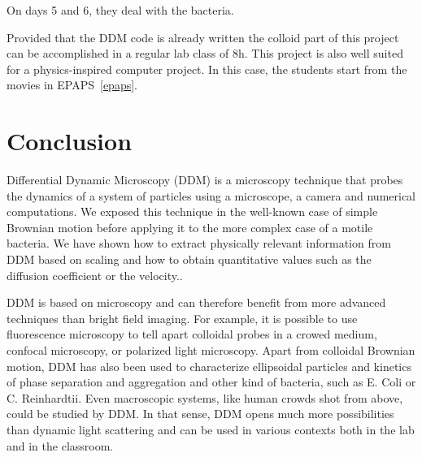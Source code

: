 \documentclass[%
 aip,
 jmp,%
 amsmath,amssymb,
reprint,%
]{revtex4-1}
\newcommand{\tg}[1]{{\color{magenta}#1}} %
\begin{document}
On days 5 and 6, they deal with the bacteria. 

\tg{Provided that the DDM code is already written the colloid part of this project can be accomplished in a regular lab class of 8h}. This project is also well suited for a physics-inspired computer project. In this case, the students start from the movies in EPAPS~\ref{epaps}.





\section{\label{cl}Conclusion}

Differential Dynamic Microscopy (DDM) is a microscopy technique that probes the dynamics of a system of particles using a microscope, a camera and numerical computations. We exposed this technique in the well-known case of simple Brownian motion before applying it to the more complex case of a motile bacteria. We have shown how to extract physically relevant information from DDM based on scaling and how to obtain quantitative values such as the diffusion coefficient or the velocity..

DDM is based  on microscopy and can therefore benefit from  more advanced techniques than bright field imaging. For example, it is possible to use fluorescence microscopy to tell apart colloidal probes in a crowed medium\cite{Hendricks2015}, confocal microscopy\cite{Lu2012}, or polarized light microscopy\citep{20_reufer2012differential}. Apart from colloidal Brownian motion, DDM has also been used to characterize ellipsoidal particles\citep{20_reufer2012differential} and kinetics of phase separation\cite{Gao2015} and aggregation\cite{Ferri2011} \tg{and other kind of bacteria, such as E. Coli or C. Reinhardtii\cite{4_Martinez20121637}}. Even macroscopic systems, like human crowds shot from above, could be studied by DDM. In that sense, DDM opens much more possibilities than dynamic light scattering and can be used in various contexts both in the lab and in the classroom.
\end{document}
